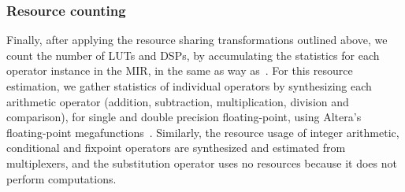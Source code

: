 \subsubsection{Resource counting}

Finally, after applying the resource sharing transformations outlined above,
we count the number of LUTs and DSPs, by accumulating the statistics for
each operator instance in the MIR, in the same as way as~\cite{soap}.  For
this resource estimation, we gather statistics of individual operators by
synthesizing each arithmetic operator (addition, subtraction, multiplication,
division and comparison), for single and double precision floating-point,
using Altera's floating-point megafunctions~\cite{altfp}.  Similarly, the
resource usage of integer arithmetic, conditional and fixpoint operators are
synthesized and estimated from multiplexers, and the substitution operator uses
no resources because it does not perform computations.
